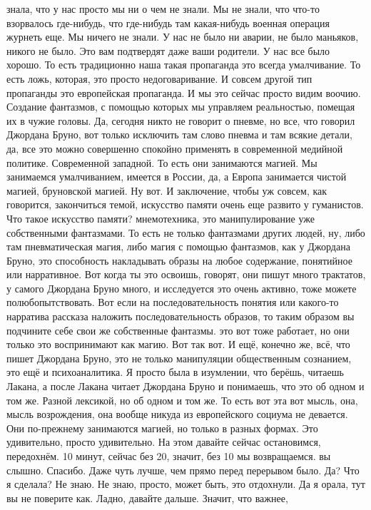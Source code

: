 знала, что у нас просто мы ни о чем не знали. Мы не знали, что что-то взорвалось
где-нибудь, что где-нибудь там какая-нибудь военная операция журнеть еще. Мы
ничего не знали. У нас не было ни аварии, не было маньяков, никого не было. Это
вам подтвердят даже ваши родители. У нас все было хорошо. То есть традиционно
наша такая пропаганда это всегда умалчивание. То есть ложь, которая, это просто
недоговаривание. И совсем другой тип пропаганды это европейская пропаганда. И мы
это сейчас просто видим воочию. Создание фантазмов, с помощью которых мы
управляем реальностью, помещая их в чужие головы. Да, сегодня никто не говорит о
пневме, но все, что говорил Джордана Бруно, вот только исключить там слово
пневма и там всякие детали, да, все это можно совершенно спокойно применять в
современной медийной политике. Современной западной. То есть они занимаются
магией. Мы занимаемся умалчиванием, имеется в России, да, а Европа занимается
чистой магией, бруновской магией. Ну вот. И заключение, чтобы уж совсем, как
говорится, закончиться темой, искусство памяти очень еще развито у гуманистов.
Что такое искусство памяти? мнемотехника, это манипулирование уже собственными
фантазмами. То есть не только фантазмами других людей, ну, либо там
пневматическая магия, либо магия с помощью фантазмов, как у Джордана Бруно, это
способность накладывать образы на любое содержание, понятийное или нарративное.
Вот когда ты это освоишь, говорят, они пишут много трактатов, у самого Джордана
Бруно много, и исследуется это очень активно, тоже можете полюбопытствовать. Вот
если на последовательность понятия или какого-то нарратива рассказа наложить
последовательность образов, то таким образом вы подчините себе свои же
собственные фантазмы. это вот тоже работает, но они только это воспринимают как
магию. Вот так вот. И ещё, конечно же, всё, что пишет Джордана Бруно, это не
только манипуляции общественным сознанием, это ещё и психоаналитика. Я просто
была в изумлении, что берёшь, читаешь Лакана, а после Лакана читает Джордана
Бруно и понимаешь, что это об одном и том же. Разной лексикой, но об одном и том
же. То есть вот эта вот мысль, она, мысль возрождения, она вообще никуда из
европейского социума не девается. Они по-прежнему занимаются магией, но только в
разных формах. Это удивительно, просто удивительно. На этом давайте сейчас
остановимся, передохнём. 10 минут, сейчас без 20, значит, без 10 мы
возвращаемся. вы слышно. Спасибо. Даже чуть лучше, чем прямо перед перерывом
было. Да? Что я сделала? Не знаю. Не знаю, просто, может быть, это отдохнули. Да
я орала, тут вы не поверите как. Ладно, давайте дальше. Значит, что важнее,
